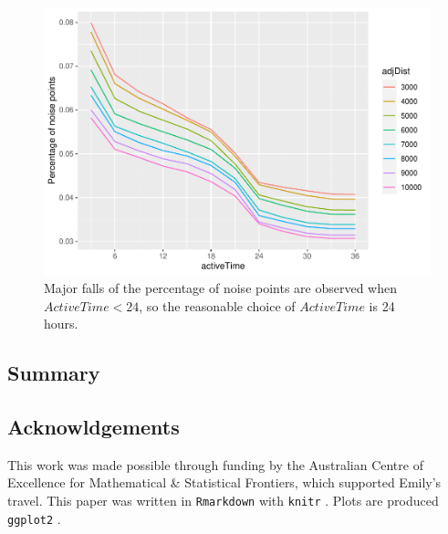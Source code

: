 \begin{Schunk}
\begin{figure}

{\centering \includegraphics[width=0.8\linewidth]{clustering_paper_files/figure-latex/vis2-1} 

}

\caption[Major falls of the percentage of noise points are observed when $ActiveTime < 24$, so the reasonable choice of $ActiveTime$ is 24 hours]{Major falls of the percentage of noise points are observed when $ActiveTime < 24$, so the reasonable choice of $ActiveTime$ is 24 hours.}\label{fig:vis2}
\end{figure}
\end{Schunk}

\hypertarget{summary}{%
\subsection{Summary}\label{summary}}

\hypertarget{acknowldgements}{%
\subsection{Acknowldgements}\label{acknowldgements}}

This work was made possible through funding by the Australian Centre of
Excellence for Mathematical \& Statistical Frontiers, which supported
Emily's travel. This paper was written in \texttt{Rmarkdown}
\citep{rmarkdown_pkg, rmarkdown, rmarkdown_cookbook} with \texttt{knitr}
\citep{knitr_pkg, knitr}. Plots are produced \texttt{ggplot2}
\citep{ggplot2}.

\clearpage




\address{%
Weihao Li\\
Monash University\\%
Econometrics and Business Statistics\\
%
%
%
\\\href{mailto:weihao.li@monash.edu}{\nolinkurl{weihao.li@monash.edu}}
}

\address{%
Emily Dodwell\\
??\\%
line 1\\ line 2\\
%
%
%
\\\href{mailto:emdodwell@gmail.com}{\nolinkurl{emdodwell@gmail.com}}
}

\address{%
Dianne Cook\\
Monash University\\%
Econometrics and Business Statistics\\
%
%
%
\\\href{mailto:dicook@monash.edu}{\nolinkurl{dicook@monash.edu}}
}
